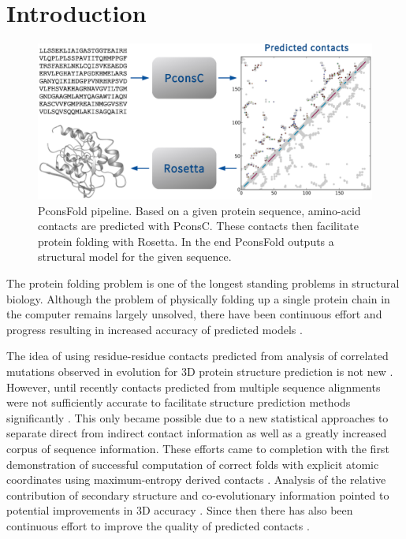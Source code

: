 \documentclass{bioinfo}
\begin{document}
\section{Introduction}
\begin{figure}[!tpb]%
\centerline{\includegraphics[scale=0.35]{figures/pipeline.eps}}
\caption{PconsFold pipeline. Based on a given protein sequence,
 amino-acid contacts are predicted with PconsC. These contacts then
 facilitate protein folding with Rosetta. In the end PconsFold
 outputs a structural model for the given
 sequence.}\label{fig:pipeline} 
\end{figure}

The protein folding problem is one of the
longest standing problems in structural biology. Although the problem
of physically folding up a single protein chain in the computer
remains largely unsolved, there have been continuous effort and
progress resulting in increased accuracy of predicted models
\cite[]{kryshtafovych_CASP10_2013}.

The idea of using residue-residue contacts predicted from analysis of
correlated mutations observed in evolution for 3D protein structure
prediction is not new
\cite[]{gobel_correlated_1994,Neher8278414,Hatrick16649265,Shindyalov_can_1994,Vendruscolo9377713}.
However, until recently contacts predicted from multiple sequence
alignments were not sufficiently accurate to facilitate structure
prediction methods significantly \cite[]{marks_protein_2012}.  This
only became possible due to a new statistical approaches to separate
direct from indirect contact information \cite[]{Lapedes1999,
  Lapedes2002, Weigt19116270,burger_disentangling_2010,
  morcos_direct-coupling_2011, marks_protein_2011} as well as a
greatly increased corpus of sequence information. These efforts came
to completion with the first demonstration of successful computation
of correct folds with explicit atomic coordinates using
maximum-entropy derived contacts \cite[]{marks_protein_2011}. Analysis
of the relative contribution of secondary structure and
co-evolutionary information pointed to potential improvements in 3D
accuracy \cite[]{Sulkowska22691493}. Since then there has also been
continuous effort to improve the quality of predicted contacts
\cite[]{jones_psicov:_2012, ekeberg_improved_2013,
  skwark_PconsC:_2013}.
\end{document}
